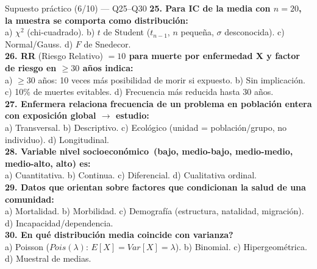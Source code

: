 \documentclass[aspectratio=169,8pt]{beamer}
\begin{document}
\begin{frame}{Supuesto pr\'actico (6/10) --- Q25--Q30}
  \scriptsize
  \textbf{25. Para IC de la media con $n=20$, la muestra se comporta como distribuci\'on:}\\
  a) $\chi^2$ (chi-cuadrado).\; b) $t$ de Student ($t_{n-1}$, $n$ peque\~na, $\sigma$ desconocida).\; c) Normal/Gauss.\; d) $F$ de Snedecor.\\[3pt]
  \textbf{26. RR} (Riesgo Relativo) \textbf{$=10$ para muerte por enfermedad X y factor de riesgo en $\ge30$ a\~nos indica:}\\
  a) $\ge30$ a\~nos: 10 veces m\'as posibilidad de morir si expuesto.\;
  b) Sin implicaci\'on.\; c) 10\% de muertes evitables.\; d) Frecuencia m\'as reducida hasta 30 a\~nos.\\[3pt]
  \textbf{27. Enfermera relaciona frecuencia de un problema en poblaci\'on entera con exposici\'on global $\to$ estudio:}\\
  a) Transversal.\; b) Descriptivo.\; c) Ecol\'ogico (unidad = poblaci\'on/grupo, no individuo).\; d) Longitudinal.\\[3pt]
  \textbf{28. Variable \guillemotleft nivel socioecon\'omico\guillemotright\ (bajo, medio-bajo, medio-medio, medio-alto, alto) es:}\\
  a) Cuantitativa.\; b) Continua.\; c) Diferencial.\; d) Cualitativa ordinal.\\[3pt]
  \textbf{29. Datos que orientan sobre factores que condicionan la salud de una comunidad:}\\
  a) Mortalidad.\; b) Morbilidad.\; c) Demograf\'ia (estructura, natalidad, migraci\'on).\; d) Incapacidad/dependencia.\\[3pt]
  \textbf{30. \textquestiondown{}En qu\'e distribuci\'on media coincide con varianza?}\\
  a) Poisson ($Pois(\lambda)$: $E[X]=Var[X]=\lambda$).\; b) Binomial.\; c) Hipergeom\'etrica.\; d) Muestral de medias.
\end{frame}
\end{document}
